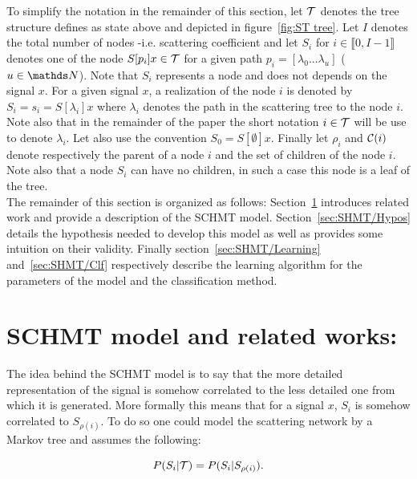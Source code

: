 \documentclass[a4paper,11pt]{report}
\begin{document}
{  To simplify the notation in the remainder of this section, let $\mathcal{T}$ denotes the tree  structure defines as state above and depicted in figure~\ref{fig:ST tree}. Let $I$ denotes the total number of nodes -i.e. scattering coefficient and let $S_{i}$ for $i \in \llbracket0, I-1 \rrbracket$ denotes one of the node $S[p_{i}]x \in \mathcal{T}$ for a given path $p_{i} = [\lambda_{0} ... \lambda_{u}]$ ($u\in \dsN$). Note that $S_{i}$ represents a node and does not depends on the signal $x$. For a given signal $x$, a realization of the node $i$ is denoted by $S_{i}= s_{i} = S[\lambda_{i}]x$ where $\lambda_{i}$ denotes the path in the scattering tree to the node $i$. Note also that in the remainder of the paper the short notation $i \in \mathcal{T}$ will be use to denote $\lambda_{i}$. Let also use the convention $S_{0} = S[\emptyset]x$. Finally let $\rho_{i}$ and $\mathcal{C}(i)$ denote respectively the parent of a node $i$ and the set of children of the node $i$. Note also that a node $S_{i}$ can have no children, in such a case this node is a leaf of the tree.\\
  
  The remainder of this section is organized as follows: Section~\ref{sec:SHMT/Rel work} introduces related work and provide a description of the SCHMT model. Section~\ref{sec:SHMT/Hypos} details the hypothesis needed to develop this model as well as provides some intuition on their validity. Finally section~\ref{sec:SHMT/Learning} and~\ref{sec:SHMT/Clf} respectively describe the learning algorithm for the parameters of the model and the classification method.

  
  \section{SCHMT model and related works:}
    \label{sec:SHMT/Rel work}
      
    The idea behind the SCHMT model is to say that the more detailed representation of the signal is somehow correlated to the less detailed one from which it is generated. More formally this means that for a signal $x$, $S_{i}$ is somehow correlated to $S_{\rho(i)}$. To do so one could model the scattering network by a Markov tree and assumes the following:
    
    \begin{equation}
      P(S_{i} |\mathcal{T}) = P(S_{i} | S_{\rho(i)}).
      \label{eq:SMT - false hypo}
    \end{equation}\\

}
\end{document}
